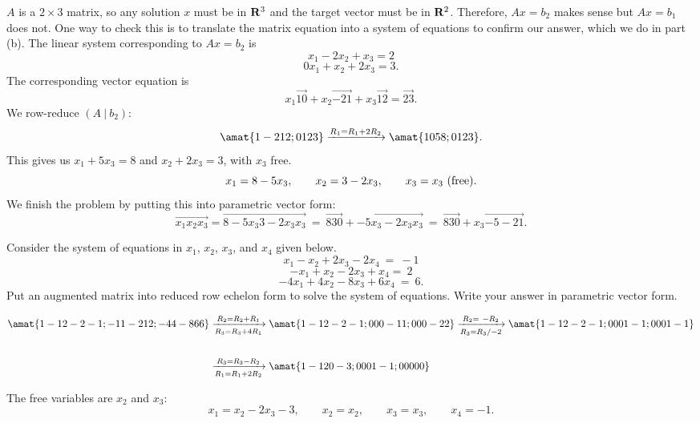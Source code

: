 \begin{problems}
\begin{solution}
  \begin{subproblems}
    \subproblem $A$ is a $2 \times 3$ matrix, so any solution $x$ must
    be in ${\bf R}^3$ and the target vector must be in ${\bf R}^2$.
    Therefore, $Ax = b_2$ makes sense but $Ax = b_1$ does not. One way
    to check this is to translate the matrix equation into a system of
    equations to confirm our answer, which we do in part (b). %
    \subproblem The linear system corresponding to $Ax = b_2$ is
    \[x_1 - 2x_2 + x_3 = 2\]
    \[0x_1 + x_2 + 2x_3 = 3.\] %
    \subproblem The corresponding vector equation is
    \[x_1 \vec{1 0} + x_2 \vec{-2 1} + x_3 \vec{1 2} = \vec{2 3}.\] %
    \subproblem We row-reduce $(A \ | \ b_2)$:
    \[\amat{1 -2 1 2; 0 1 2 3} \xrightarrow[]{R_1 = R_1 + 2R_2}
      \amat{1 0 5 8; 0 1 2 3}.\] This gives us $x_1 + 5 x_3 = 8$ and
    $x_2 + 2x_3 = 3$, with $x_3$ free.
    \[x_1 = 8 - 5x_3, \qquad x_2 = 3 - 2x_3, \qquad x_3 = x_3
      \textup{ (free)}.\]
    We finish the problem by putting this into parametric vector form:
    \[\vec{x_1 x_2 x_3} = \vec{8-5x_3 3-2x_3 x_3}
      \ = \ \vec{8 3 0} + \vec{-5x_3 -2x_3 x_3}
      \ = \ \vec{8 3 0} + x_3 \vec{-5 -2 1}.\]
  \end{subproblems}
\end{solution}

  
\problem %
  Consider the system of equations in $x_1$, $x_2$, $x_3$, and $x_4$
  given below.
    \[x_1 - x_2 + 2x_3 - 2x_4 \ = \ -1\]
    \[-x_1 + x_2 -2x_3 + x_4 = \ 2\]
    \[-4x_1 + 4x_2 -8x_3 + 6x_4 \ = \ 6.\] Put an augmented matrix
    into reduced row echelon form to solve the system of equations.
    Write your answer in parametric vector form.

    \begin{solution}
      \begin{align*}
        \amat{1 -1 2 -2 -1; -1 1 -2 1 2; -4 4 -8 6 6}
        &
          \xrightarrow[R_3=R_3+4R_1]{R_2=R_2+R_1}
          \amat{1 -1 2 -2 -1; 0 0 0 -1 1; 0 0 0 -2 2}
          \xrightarrow[R_3= R_3/-2]{R_2= \ -R_2}
          \amat{1 -1 2 -2 -1; 0 0 0 1 -1; 0 0 0 1 -1}
        \\ \\
        & \xrightarrow[R_1= R_1+2R_2]{R_3=R_3-R_2}
          \amat{1 -1 2 0 -3; 0 0 0 1 -1; 0 0 0 0 0}
      \end{align*}

      The free variables are $x_2$ and $x_3$:
      \[x_1= x_2-2x_3-3, \qquad x_2=x_2, \qquad x_3=x_3, \qquad x_4=
        -1.\]


\end{solution}
\end{problems}
